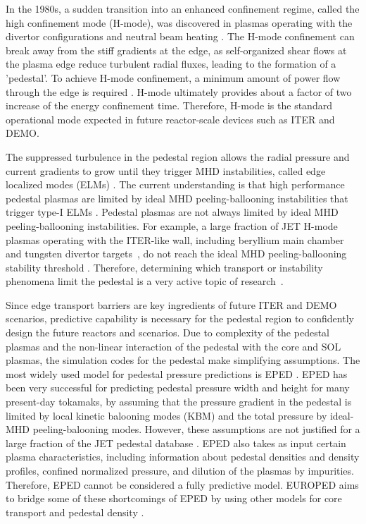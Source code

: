 \documentclass[a4paper, twoside, final, 12pt]{article}
\begin{document}
In the 1980s, a sudden transition into an enhanced confinement regime, called the high confinement mode (H-mode), was discovered in plasmas operating with the divertor configurations and neutral beam heating \cite{PhysRevLett}.
The H-mode confinement can break away from the stiff gradients at the edge, as self-organized shear flows at the plasma edge reduce turbulent radial fluxes, leading to the formation of a 'pedestal'.
To achieve H-mode confinement, a minimum amount of power flow through the edge is required \cite{Martin_2008}. H-mode ultimately provides about a factor of two increase of the energy confinement time. Therefore, H-mode is the standard operational mode expected in future reactor-scale devices such as ITER and DEMO.

The suppressed turbulence in the pedestal region allows the radial pressure  and current gradients to grow until they trigger MHD instabilities, called edge localized modes (ELMs) \cite{ELM_s, Viezzer_2018}.
The current understanding is that high performance pedestal plasmas are limited by ideal MHD peeling-ballooning instabilities that trigger type-I ELMs \cite{ELM_s}.
Pedestal plasmas are not always limited by ideal MHD peeling-ballooning instabilities.
For example, a large fraction of JET H-mode plasmas operating with the ITER-like wall, including beryllium main chamber and tungsten divertor targets~\cite{PHILIPPS20101581}, do not reach the ideal MHD peeling-ballooning stability threshold \cite{Frassinetti_2020}.  Therefore, determining which transport or instability phenomena limit the pedestal is a very active topic of research~\cite{electron_transport, Catto_2013, Kotschenreuther_2019}.

Since edge transport barriers are key ingredients of future ITER and DEMO scenarios, predictive capability is necessary for the pedestal region to confidently design the future reactors and scenarios.
Due to complexity of the pedestal plasmas and the non-linear interaction of the pedestal with the core and SOL plasmas, the simulation codes for the pedestal make simplifying assumptions. The most widely used model for pedestal pressure predictions is EPED \cite{EPED_ELM, Snyder_2011}. 
EPED has been very successful for predicting pedestal pressure width and height for many present-day tokamaks, by assuming that the pressure gradient in the pedestal is limited by local kinetic balooning modes (KBM) and the total pressure by ideal-MHD peeling-balooning modes. However, these assumptions are not justified for a large fraction of the JET pedestal database \cite{Frassinetti_2020}. EPED also takes as input certain plasma characteristics, including information about pedestal densities and density profiles, confined normalized pressure, and dilution of the plasmas by impurities. Therefore, EPED cannot be considered a fully predictive model. EUROPED aims to bridge some of these shortcomings of EPED by using other models for core transport and pedestal density \cite{Saarelma_2017, pedestal_prediction}. 
\end{document}
